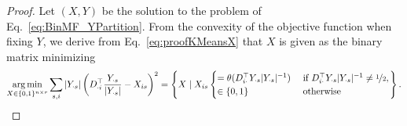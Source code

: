 \BMFpartition*
\begin{proof}
Let $(X,Y)$ be the solution to the problem of Eq.~\eqref{eq:BinMF_YPartition}. From the convexity of the objective function when fixing $Y$, we derive from Eq.~\eqref{eq:proofKMeansX} that $X$ is given as the binary matrix minimizing
\[\operatorname*{arg\,min}_{X\in \{0,1\}^{n\times r}}\sum_{s,i}|Y_{\cdot s}|\left(D_{\cdot i}^\top \frac{Y_{\cdot s}}{|Y_{\cdot s}|}-X_{is}\right)^2 = \left\{X\mid X_{is} 
\begin{cases}
= \theta(D_{i\cdot}^\top Y_{\cdot s}|Y_{\cdot s}|^{-1}) &\text{ if } D_{i\cdot}^\top Y_{\cdot s}|Y_{\cdot s}|^{-1}\neq \nicefrac{1}{2},\\ 
\in\{0,1\} &\text{ otherwise} 
\end{cases}\right\}.\]
\end{proof}